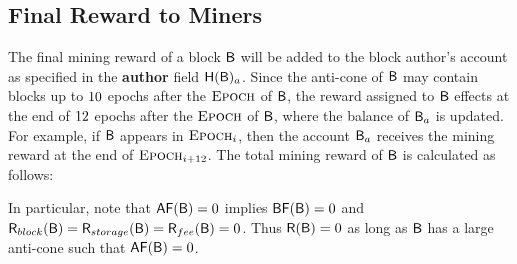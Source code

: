 \subsection{Final Reward to Miners}

The final mining reward of a block $\textsf{B}$ will be added to the block author's account as specified in the {\bf author} field $\textsf{H}(\textsf{B})_a$.
Since the anti-cone of $\textsf{B}$ may contain blocks up to ${10}$ epochs after the $\textsc{Epoch}$ of $\textsf{B}$,
the reward assigned to $\textsf{B}$ effects at the end of $12$ epochs after the $\textsc{Epoch}$ of $\textsf{B}$, where the balance of $\textsf{B}_a$ is updated.
For example, if $\textsf{B}$ appears in $\textsc{Epoch}_i$, then the account $\textsf{B}_a$ receives the mining reward at the end of $\textsc{Epoch}_{i+12}$. 
The total mining reward of $\textsf{B}$ is calculated as follows:

\oldversion{
	\begin{align}
		\reward(\block)\eqdef \af(\block)\cdot \award(\block)  + \feeaward(\block) = \af(\block)\cdot\basef(\block)\cdot\wf(\block)\cdot\award(\epoch_\block) + \feeaward(\block)
	\end{align}
}
\newversion{
	\begin{align}
	\reward(\block)\eqdef  \award(\block) + \storageaward(\block) + \feeaward(\block) 
\end{align}
}

In particular, note that $\mathsf{AF}(\textsf{B})=0$ implies $\mathsf{BF}(\textsf{B})=0$ and $\textsf{R}_{block}(\textsf{B})=\textsf{R}_{storage}(\textsf{B})=\textsf{R}_{fee}(\textsf{B})=0$.
Thus  
$\textsf{R}(\textsf{B})=0$ as long as $\textsf{B}$ has a large anti-cone such that $\mathsf{AF}(\textsf{B})=0$.






